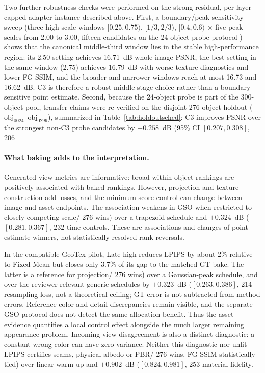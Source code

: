 \documentclass[times,twocolumn,final]{elsarticle}
\providecommand{\DIFadd}[1]{{\protect\color{blue} \sf #1}} %
\providecommand{\DIFdel}[1]{{\protect\color{red} \scriptsize #1}} %
\providecommand{\DIFaddbegin}{} %
\providecommand{\DIFaddend}{} %
\providecommand{\DIFdelbegin}{} %
\providecommand{\DIFdelend}{} %
\begin{document}
\DIFdelbegin \DIFdel{Two further robustness checks were performed on the strong-residual, per-layer-capped adapter instance described above. First, a boundary/peak sensitivity sweep (three high-scale windows $[0.25,0.75)$, $[1/3,2/3)$, $[0.4,0.6)$ $\times$ five peak scales from 2.00 to 3.00, fifteen candidates on the 24-object probe protocol ) shows that the canonical middle-third window lies in the stable high-performance region: its 2.50 setting achieves 16.71~dB whole-image PSNR, the best setting in the same window (2.75) achieves 16.79~dB with worse texture diagnostics and lower FG-SSIM, and the broader and narrower windows reach at most 16.73 and 16.62~dB. C3 is therefore a robust middle-stage choice rather than a boundary-sensitive point estimate. Second, because the 24-object probe is part of the 300-object pool, transfer claims were re-verified on the disjoint 276-object holdout ($\mathrm{obj}_{0024}$--$\mathrm{obj}_{0299}$), summarized in Table~\ref{tab:holdoutsched}: C3 improves PSNR over the strongest non-C3 probe candidates by $+0.258$~dB (95\% CI $[0.207,0.308]$, 206}\DIFdelend \DIFaddbegin \paragraph{What baking adds to the interpretation.}
\DIFadd{Generated-view metrics are informative: broad within-object rankings are positively associated with baked rankings. However, projection and texture construction add losses, and the minimum-score control can change between image and asset endpoints. The association weakens in GSO when restricted to closely competing scale}\DIFaddend /\DIFdelbegin \DIFdel{276 wins) over a trapezoid schedule and $+0.324$~dB ($[0.281,0.367]$, 232}\DIFdelend \DIFaddbegin \DIFadd{time controls. These are associations and changes of point-estimate winners, not statistically resolved rank reversals.
}

\DIFadd{In the compatible GeoTex pilot, Late-high reduces LPIPS by about 2\% relative to Fixed Mean but closes only 3.7\% of its gap to the matched GT bake. The latter is a reference for projection}\DIFaddend /\DIFdelbegin \DIFdel{276 wins) over a Gaussian-peak schedule, and over the reviewer-relevant generic schedules by $+0.323$~dB ($[0.263,0.386]$, 214}\DIFdelend \DIFaddbegin \DIFadd{resampling loss, not a theoretical ceiling; GT error is not subtracted from method errors. Reference-color and detail discrepancies remain visible, and the separate GSO protocol does not detect the same allocation benefit. Thus the asset evidence quantifies a local control effect alongside the much larger remaining appearance problem. Incoming-view disagreement is also a distinct diagnostic: a constant wrong color can have zero variance. Neither this diagnostic nor unlit LPIPS certifies seams, physical albedo or PBR}\DIFaddend /\DIFdelbegin \DIFdel{276 wins, FG-SSIM statistically tied) over linear warm-up and $+0.902$~dB ($[0.824,0.981]$, 253}\DIFdelend \DIFaddbegin \DIFadd{material fidelity.
}
\end{document}
